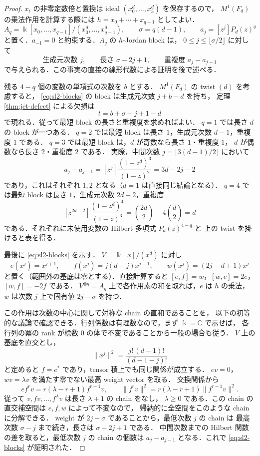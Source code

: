 \documentclass[a4paper,11pt]{ltjsarticle}
\numberwithin{equation}{section}
\theoremstyle{plain}
\theoremstyle{definition}
\theoremstyle{remark}
\begin{document}
\begin{proof}
$x_i$ の非零定数倍と置換は ideal $(x_0^d,\ldots,x_3^d)$ を保存するので，
$M^1(F_d)$ の乗法作用を計算する際には $h=x_0+\cdots+x_{q-1}$ としてよい．
\[
 A_q=\Bbbk[x_0,\ldots,x_{q-1}]/(x_0^d,\ldots,x_{q-1}^d),\qquad
 \sigma=q(d-1),\qquad a_j=[z^j]P_d(z)^q
\]
と置く．$a_{-1}=0$ と約束する．$A_q$ の $h$-Jordan block は，
$0\leq j\leq\lfloor\sigma/2\rfloor$ に対して
\[
 \text{生成元次数 }j,\qquad
 \text{長さ }\sigma-2j+1,\qquad
 \text{重複度 }a_j-a_{j-1}
 \tag{\dagger}\label{eq:sl2-blocks}
\]
で与えられる．この事実の直接の線形代数による証明を後で述べる．

残る $4-q$ 個の変数の単項式の次数を $b$ とする．
$M^1(F_d)$ の twist $(d)$ を考慮すると，
\eqref{eq:sl2-blocks} の block は生成元次数 $j+b-d$ を持ち，
定理 \ref{thm:jet-defect} による欠損は
\[
 t=b+\sigma-j+1-d
\]
で現れる．従って最短 block の長さと重複度を求めればよい．
$q=1$ では長さ $d$ の block が一つある．
$q=2$ では最短 block は長さ $1$，生成元次数 $d-1$，重複度 $1$ である．
$q=3$ では最短 block は，$d$ が奇数なら長さ $1$・重複度 $1$，
$d$ が偶数なら長さ $2$・重複度 $2$ である．
実際，中間次数 $j=\lfloor3(d-1)/2\rfloor$ において
\[
 a_j-a_{j-1}=[z^j]\frac{(1-z^d)^3}{(1-z)^2}
 =3d-2j-2
\]
であり，これはそれぞれ $1,2$ となる（$d=1$ は直接同じ結論となる）．
$q=4$ では最短 block は長さ $1$，生成元次数 $2d-2$，重複度
\[
 [z^{2d-2}]\frac{(1-z^d)^4}{(1-z)^3}
 =\binom{2d}{2}-4\binom d2=d
\]
である．それぞれに未使用変数の Hilbert 多項式 $P_d(z)^{4-q}$ と
上の twist を掛けると表を得る．

最後に \eqref{eq:sl2-blocks} を示す．
$V=\Bbbk[x]/(x^d)$ に対し
\[
 e(x^j)=x^{j+1},\qquad
 f(x^j)=j(d-j)x^{j-1},\qquad
 w(x^j)=(2j-d+1)x^j
\]
と置く（範囲外の基底は零とする）．直接計算すると
$[e,f]=w$，$[w,e]=2e$，$[w,f]=-2f$ である．
$V^{\otimes q}=A_q$ 上で各作用素の和を取れば，$e$ は $h$ の乗法，
$w$ は次数 $j$ 上で固有値 $2j-\sigma$ を持つ．

この作用は次数の中心に関して対称な chain の直和であることを，
以下の初等的な議論で確認できる．行列係数は有理数なので，まず $\Bbbk=\mathbb C$ で示せば，
各行列の冪の rank が標数 $0$ の体で不変であることから一般の場合も従う．
$V$ 上の基底を直交とし，
\[
 \|x^j\|^2=\frac{j!\,(d-1)!}{(d-1-j)!}
\]
と定めると $f=e^*$ であり，tensor 積上でも同じ関係が成立する．
$e v=0$，$wv=\lambda v$ を満たす零でない最高 weight vector を取る．
交換関係から
\[
 ef^rv=r(\lambda-r+1)f^{r-1}v,
 \qquad
 \|f^rv\|^2=r(\lambda-r+1)\|f^{r-1}v\|^2.
\]
従って $v,fv,\ldots,f^{\lambda}v$ は長さ $\lambda+1$ の chain をなし，
$\lambda\geq0$ である．この chain の直交補空間は $e,f,w$ によって不変なので，
帰納的に全空間をこのような chain に分解できる．
weight が $2j-\sigma$ であることから，最低次数 $j$ の chain は
最高次数 $\sigma-j$ まで続き，長さは $\sigma-2j+1$ である．
中間次数までの Hilbert 関数の差を取ると，最低次数 $j$ の chain の個数は
$a_j-a_{j-1}$ となる．これで \eqref{eq:sl2-blocks} が証明された．
\end{proof}
\end{document}
